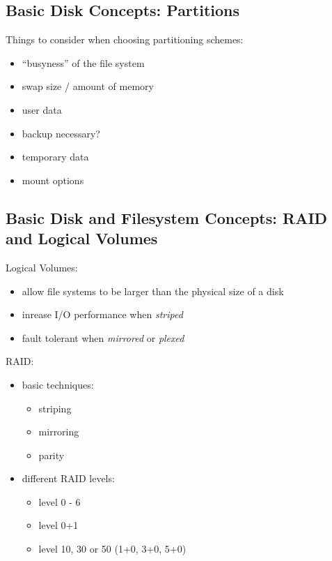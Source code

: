 \documentclass[xga]{xdvislides}
\begin{document}
\subsection{Basic Disk Concepts: Partitions}
Things to consider when choosing partitioning schemes:
\begin{itemize}
	\item ``busyness'' of the file system
	\item swap size / amount of memory
	\item user data
	\item backup necessary?
	\item temporary data
	\item mount options
\end{itemize}

\subsection{Basic Disk and Filesystem Concepts: RAID and Logical Volumes}
Logical Volumes:
\begin{itemize}
	\item allow file systems to be larger than the physical size of a disk
	\item inrease I/O performance when {\em striped}
	\item fault tolerant when {\em mirrored} or {\em plexed}
\end{itemize}

RAID:
\begin{itemize}
	\item basic techniques:
		\begin{itemize}
			\item striping
			\item mirroring
			\item parity
		\end{itemize}
	\item different RAID levels:
		\begin{itemize}
			\item level 0 - 6
			\item level 0+1
			\item level 10, 30 or 50 (1+0, 3+0, 5+0)
		\end{itemize}
\end{itemize}
\end{document}
